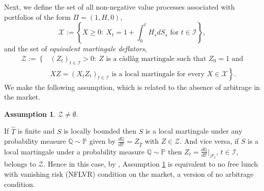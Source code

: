 \documentclass[11pt, oneside]{article}   	%
\theoremstyle{plain}
\theoremstyle{definition}
\newtheorem{assume}[thm]{Assumption}
\theoremstyle{remark}
\begin{document}
Next, we define the set of all non-negative value processes associated with portfolios of the form $\Pi=(1,H,0)$,
$$\mathcal{X}:=\left\{X\geq 0:\ X_t=1+\int_0^t H_sdS_s \text{ for } t\in\mathcal{I}\right\},$$
and the set of \textit{equivalent martingale deflators},
\begin{align*}
\mathcal{Z}:=\left\{\right.&\left.(Z_t)_{t\in\mathcal{I}}>0:\ Z \text{ is a c\`adl\`ag martingale such that } Z_0=1 \text{ and}\right.\\
&\left. XZ=(X_tZ_t)_{t\in\mathcal{I}} \text{ is a local martingale for every } X\in\mathcal{X}\right\}.
\end{align*}
We make the following assumption, which is related to the absence of arbitrage in the market.
\begin{assume}\label{ass:NA}$\mathcal{Z}\neq\emptyset$.\end{assume}
If $\hat{T}$ is finite and $S$ is locally bounded then $S$ is a local martingale under any probability measure $\mathbb{Q}\sim \mathbb{P}$ given by $\frac{d\mathbb{Q}}{d\mathbb{P}}=Z_{\hat{T}}$ with $Z\in\mathcal{Z}$. And vice versa, if $S$ is a local martingale under a probability measure $\mathbb{Q}\sim \mathbb{P}$ then $Z_t=\frac{d\mathbb{Q}}{d\mathbb{P}}\big\vert_{\mathcal{F}_{t}}$, $t\in\mathcal{I}$, belongs to $\mathcal{Z}$. Hence in this case, by \cite[Corollary 1.2]{delbaen_general_1994}, Assumption \ref{ass:NA} is equivalent to no free lunch with vanishing risk (NFLVR) condition on the market, a version of no arbitrage condition.
\end{document}
